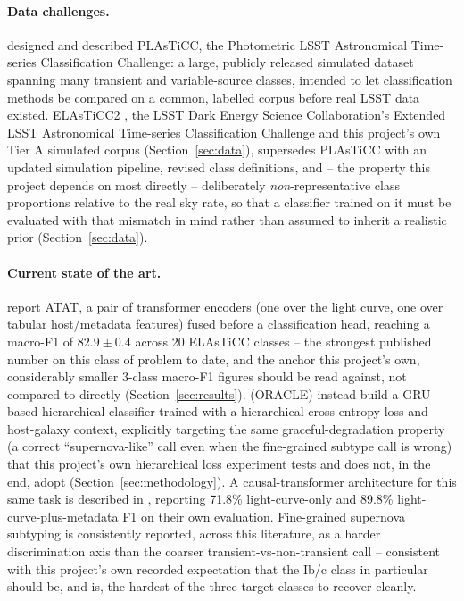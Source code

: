 \paragraph{Data challenges.}
\citet{kessler2019plasticc} designed and described PLAsTiCC, the Photometric
LSST Astronomical Time-series Classification Challenge: a large, publicly
released simulated dataset spanning many transient and variable-source
classes, intended to let classification methods be compared on a common,
labelled corpus before real LSST data existed. ELAsTiCC2 \citep{elasticc2},
the LSST Dark Energy Science Collaboration's Extended LSST Astronomical
Time-series Classification Challenge and this project's own Tier A
simulated corpus (Section~\ref{sec:data}), supersedes PLAsTiCC with an
updated simulation
pipeline, revised class definitions, and -- the property this project
depends on most directly -- deliberately \emph{non}-representative class
proportions relative to the real sky rate, so that a classifier trained on
it must be evaluated with that mismatch in mind rather than assumed to
inherit a realistic prior (Section~\ref{sec:data}).

\paragraph{Current state of the art.}
\citet{cabreravives2024atat} report ATAT, a pair of transformer encoders
(one over the light curve, one over tabular host/metadata features) fused
before a classification head, reaching a macro-F1 of $82.9 \pm 0.4$ across
20 ELAsTiCC classes -- the strongest published number on this class of
problem to date, and the anchor this project's own, considerably smaller
3-class macro-F1 figures should be read against, not compared to directly
(Section~\ref{sec:results}). \citet{shah2025oracle} (ORACLE) instead build
a GRU-based hierarchical classifier trained with a hierarchical
cross-entropy loss and host-galaxy context, explicitly targeting the same
graceful-degradation property (a correct ``supernova-like'' call even when
the fine-grained subtype call is wrong) that this project's own hierarchical
loss experiment tests and does not, in the end, adopt
(Section~\ref{sec:methodology}). A causal-transformer architecture for this
same task is described in \citet{atcat2025}, reporting 71.8\% light-curve-only
and 89.8\% light-curve-plus-metadata F1 on their own evaluation. Fine-grained
supernova subtyping is consistently reported, across this literature, as a
harder discrimination axis than the coarser transient-vs-non-transient call
-- consistent with this project's own recorded expectation that the Ib/c
class in particular should be, and is, the hardest of the three target
classes to recover cleanly.

